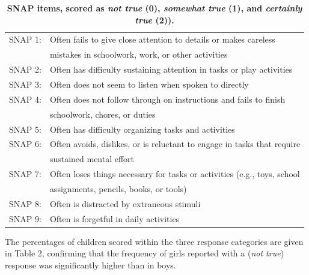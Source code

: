 \documentclass[10pt,letterpaper]{article}
\begin{document}
\begin{table}[!ht]
\begin{adjustwidth}{-5mm}{0in} %
\centering
\caption{\bf SNAP items, scored as \emph{not true} (0), \emph{somewhat true} (1), and \emph{certainly true} (2)).}
\vspace{5mm}
\begin{tabular}{|ll|}
\hline
SNAP 1: & Often fails to give close attention to details or makes careless\\ & mistakes in schoolwork, work, or other activities\\ \hline
SNAP 2: & Often has difficulty sustaining attention in tasks or play activities \\ \hline
SNAP 3: & Often does not seem to listen when spoken to directly \\ \hline
SNAP 4: & Often does not follow through on instructions and fails to finish\\ &  schoolwork, chores, or duties\\ \hline
SNAP 5: & Often has difficulty organizing tasks and activities \\ \hline
SNAP 6: & Often avoids, dislikes, or is reluctant to engage in tasks that require\\ & sustained mental effort\\ \hline
SNAP 7: & Often loses things necessary for tasks or activities (e.g., toys, school\\ &  assignments, pencils, books, or tools) \\ \hline
SNAP 8: & Often is distracted by extraneous stimuli\\ \hline
SNAP 9: & Often is forgetful in daily activities \\ \hline
\end{tabular}
\label{Table1}
\end{adjustwidth}
\end{table}



The percentages of children scored within the three response categories are given in Table 2, confirming that the  frequency of girls reported with a (\emph{not true}) response was significantly higher than in boys. \\

\vspace{5mm}
\end{document}

